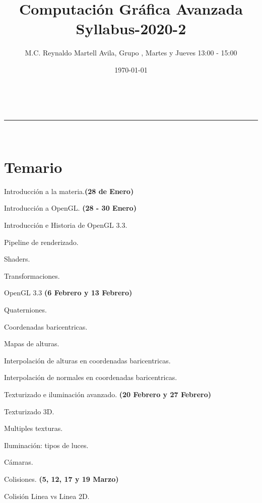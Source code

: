 \documentclass[a4paper,11pt]{article}
\makeatletter
\newcommand{\linia}{\rule{\linewidth}{0.5pt}}
\theoremstyle{mytheor}
\renewcommand{\maketitle}{
\begin{center}
\vspace{2ex}
{\huge \textsc{\@title}}
\vspace{1ex}
\\
\linia\\
\@author \hfill \@date
\vspace{4ex}
\end{center}
}
\makeatother
\begin{document}
\title{Computación Gráfica Avanzada \\ Syllabus-2020-2}

\author{M.C. Reynaldo Martell Avila, Grupo  , Martes y Jueves 13:00 - 15:00}

\date{\today}

\maketitle

\section*{Temario}

Introducción a la materia.\textbf{(28 de Enero)}
\begin{legal}
	\item Introducción a OpenGL. \textbf{(28 - 30 Enero)}
	\begin{legal}
		\item Introducción e Historia de OpenGL 3.3.
		\item Pipeline de renderizado.
		\item Shaders.
		\item Transformaciones.
	\end{legal}
	\item OpenGL 3.3 \textbf{(6 Febrero y 13 Febrero)}
	\begin{legal}
		\item Quaterniones.
		\item Coordenadas baricentricas.
		\item Mapas de alturas.
		\item Interpolación de alturas en coordenadas baricentricas.
		\item Interpolación de normales en coordenadas baricentricas.
	\end{legal}
	\item Texturizado e iluminación avanzado. \textbf{(20 Febrero y 27 Febrero)}
	\begin{legal}
		\item Texturizado 3D.
		\item Multiples texturas.
		\item Iluminación: tipos de luces.
		\item Cámaras.
	\end{legal}
	\item Colisiones. \textbf{(5, 12, 17 y 19 Marzo)}
	\begin{legal}
		\item Colisión Linea vs Linea 2D.

\end{legal}
\end{legal}
\end{document}
